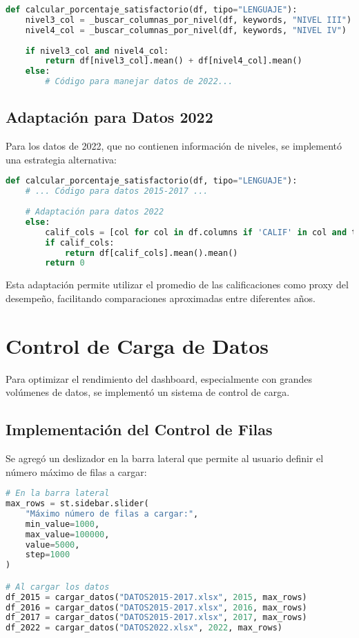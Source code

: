 \begin{lstlisting}[language=Python, caption=Cálculo de porcentaje satisfactorio para 2015-2017]
def calcular_porcentaje_satisfactorio(df, tipo="LENGUAJE"):
    nivel3_col = _buscar_columnas_por_nivel(df, keywords, "NIVEL III")
    nivel4_col = _buscar_columnas_por_nivel(df, keywords, "NIVEL IV")
    
    if nivel3_col and nivel4_col:
        return df[nivel3_col].mean() + df[nivel4_col].mean()
    else:
        # Código para manejar datos de 2022...
\end{lstlisting}

\subsection{Adaptación para Datos 2022}
Para los datos de 2022, que no contienen información de niveles, se implementó una estrategia alternativa:

\begin{lstlisting}[language=Python, caption=Adaptación de cálculo para datos 2022]
def calcular_porcentaje_satisfactorio(df, tipo="LENGUAJE"):
    # ... Código para datos 2015-2017 ...
    
    # Adaptación para datos 2022
    else:
        calif_cols = [col for col in df.columns if 'CALIF' in col and tipo in col]
        if calif_cols:
            return df[calif_cols].mean().mean()
        return 0
\end{lstlisting}

Esta adaptación permite utilizar el promedio de las calificaciones como proxy del desempeño, facilitando comparaciones aproximadas entre diferentes años.

\section{Control de Carga de Datos}
Para optimizar el rendimiento del dashboard, especialmente con grandes volúmenes de datos, se implementó un sistema de control de carga.

\subsection{Implementación del Control de Filas}
Se agregó un deslizador en la barra lateral que permite al usuario definir el número máximo de filas a cargar:

\begin{lstlisting}[language=Python, caption=Implementación del control de filas]
# En la barra lateral
max_rows = st.sidebar.slider(
    "Máximo número de filas a cargar:", 
    min_value=1000, 
    max_value=100000, 
    value=5000, 
    step=1000
)

# Al cargar los datos
df_2015 = cargar_datos("DATOS2015-2017.xlsx", 2015, max_rows)
df_2016 = cargar_datos("DATOS2015-2017.xlsx", 2016, max_rows)
df_2017 = cargar_datos("DATOS2015-2017.xlsx", 2017, max_rows)
df_2022 = cargar_datos("DATOS2022.xlsx", 2022, max_rows)
\end{lstlisting}

